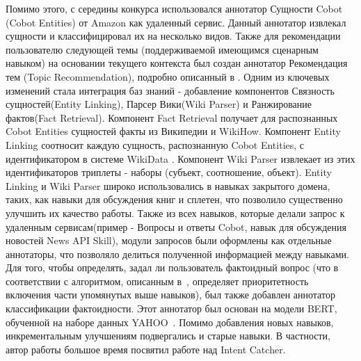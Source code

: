 Помимо этого, с середины конкурса использовался аннотатор Сущности Cobot (Cobot Entities) от Amazon как удаленный сервис. Данный аннотатор извлекал сущности и классифицировал их на несколько видов.
Также для рекомендации пользователю следующей темы (поддерживаемой имеющимся сценарным навыком) на основании текущего контекста был создан аннотатор Рекомендация тем (Topic Recommendation), подробно описанный в \cite{dream2}.
Одним из ключевых изменений стала интеграция баз знаний - добавление компонентов Связность сущностей(Entity Linking), Парсер Вики(Wiki Parser) и Ранжирование фактов(Fact Retrieval). Компонент Fact Retrieval получает для распознанных Cobot Entities сущностей факты из Википедии и WikiHow\cite{wikihow}.  Компонент Entity Linking соотносит каждую сущность, распознанную Cobot Entities, с идентификатором в системе WikiData \cite{vrandei_2014}. Компонент Wiki Parser извлекает из этих идентификаторов триплеты - наборы (субъект, соотношение, объект). Entity Linking и Wiki Parser широко использовались в навыках закрытого домена, таких, как навыки для обсуждения книг и сплетен, что позволило существенно улучшить их качество работы.
Также из всех навыков, которые делали запрос к удаленным сервисам(пример - Вопросы и ответы Cobot, навык для обсуждения новостей News API Skill), модули запросов были оформлены как отдельные аннотаторы, что позволяло делиться полученной информацией между навыками.
Для того, чтобы определять, задал ли пользователь фактоидный вопрос (что в соответствии с алгоритмом, описанным в~\cite{dream2}, определяет приоритетность включения части упомянутых выше навыков), был также добавлен аннотатор классификации фактоидности. Этот аннотатор был основан на модели BERT, обученной на наборе данных YAHOO~\cite{yahoo_dataset}.
Помимо добавления новых навыков, инкрементальным улучшениям подвергались и старые навыки. В частности, автор работы большое время посвятил работе над Intent Catcher. 

